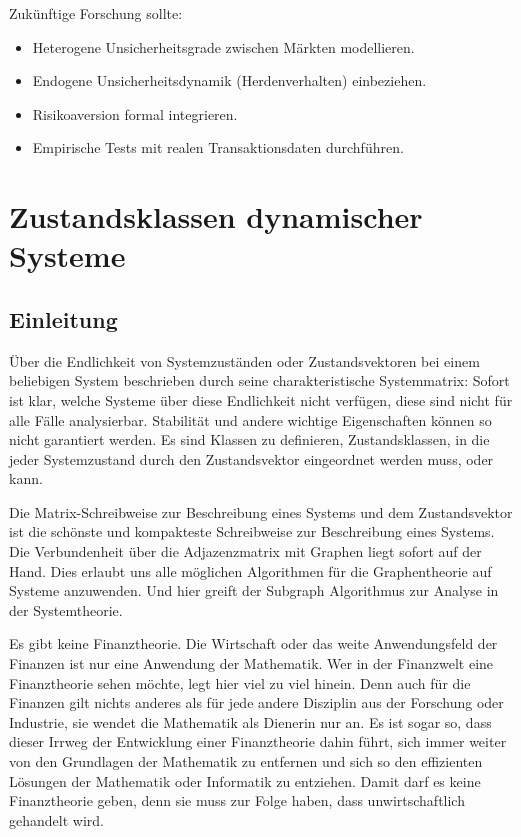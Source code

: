 \documentclass[a4paper, 12pt, twoside, openright]{report}
\theoremstyle{definition}
\theoremstyle{definition}
\begin{document}
Zukünftige Forschung sollte:
\begin{itemize}
    \item Heterogene Unsicherheitsgrade zwischen Märkten modellieren.
    \item Endogene Unsicherheitsdynamik (Herdenverhalten) einbeziehen.
    \item Risikoaversion formal integrieren.
    \item Empirische Tests mit realen Transaktionsdaten durchführen.
\end{itemize}

\cleardoublepage

\chapter{Zustandsklassen dynamischer Systeme}
\label{ch:state-classes}

\section{Einleitung}

Über die Endlichkeit von Systemzuständen oder Zustandsvektoren bei einem beliebigen
System beschrieben durch seine charakteristische Systemmatrix: Sofort ist klar, welche Systeme
über diese Endlichkeit nicht verfügen, diese sind nicht für alle Fälle analysierbar. Stabilität
und andere wichtige Eigenschaften können so nicht garantiert werden. Es sind Klassen zu
definieren, Zustandsklassen, in die jeder Systemzustand durch den Zustandsvektor
eingeordnet werden muss, oder kann.

Die Matrix-Schreibweise zur Beschreibung eines Systems und dem Zustandsvektor ist die
schönste und kompakteste Schreibweise zur Beschreibung eines Systems. Die Verbundenheit
über die Adjazenzmatrix mit Graphen liegt sofort auf der Hand. Dies erlaubt uns alle
möglichen Algorithmen für die Graphentheorie auf Systeme anzuwenden. Und hier greift der
Subgraph Algorithmus zur Analyse in der Systemtheorie.

Es gibt keine Finanztheorie. Die Wirtschaft oder das weite Anwendungsfeld der Finanzen
ist nur eine Anwendung der Mathematik. Wer in der Finanzwelt eine Finanztheorie sehen
möchte, legt hier viel zu viel hinein. Denn auch für die Finanzen gilt nichts anderes
als für jede andere Disziplin aus der Forschung oder Industrie, sie wendet
die Mathematik als Dienerin nur an. Es ist sogar so, dass dieser Irrweg der Entwicklung
einer Finanztheorie dahin führt, sich immer weiter von den Grundlagen der Mathematik zu
entfernen und sich so den effizienten Lösungen der Mathematik oder Informatik zu
entziehen. Damit darf es keine Finanztheorie geben, denn sie muss zur Folge haben, dass
unwirtschaftlich gehandelt wird.
\end{document}
